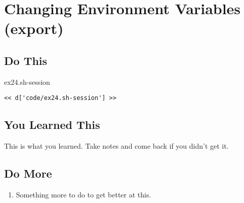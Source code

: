 \chapter{Changing Environment Variables (export)}

\section{Do This}

\begin{code}{ex24.sh-session}
\begin{Verbatim}
<< d['code/ex24.sh-session'] >>
\end{Verbatim}
\end{code}


\section{You Learned This}

This is what you learned.  Take notes and come back if you didn't get it.

\section{Do More}

\begin{enumerate}
\item Something more to do to get better at this.
\end{enumerate}

